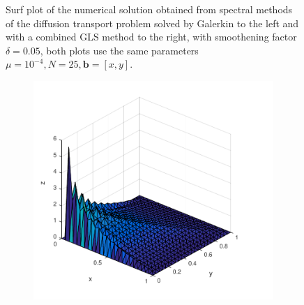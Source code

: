 \begin{figure}[h]
\begin{subfigure}[b]{0.48\textwidth}
  \end{subfigure}
  \vspace{-0.1\baselineskip}
  \caption{Surf plot of the numerical solution obtained from spectral methods of the diffusion transport problem solved by Galerkin to the left and with a combined GLS method to the right, with smoothening factor $\delta = 0.05$, both plots use the same parameters $\mu = 10^{-4}, N=25,\mathbf{b} = [x,y]$.}
  \label{fig:SurfDiffTransPositive}
\end{figure}
%
%
\begin{figure}[h]
  \centering
  \begin{subfigure}[b]{0.48\textwidth}
	\includegraphics[width=\textwidth]{Figures/FEM_difftrans_aNeg.pdf}
  \end{subfigure}%
  \quad
  \begin{subfigure}[b]{0.48\textwidth}

\end{subfigure}
\end{figure}
